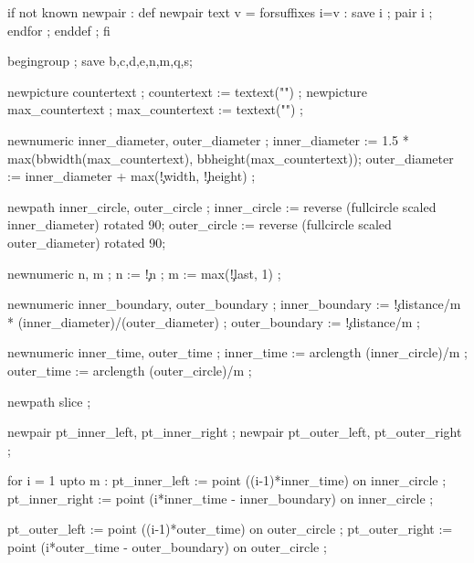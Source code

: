

\startMPdefinitions
  if not known newpair :
      def newpair    text v = forsuffixes i=v : save i ; pair    i ; endfor ; enddef ;
  fi 
\stopMPdefinitions

  begingroup ;
  save b,c,d,e,n,m,q,s;

  newpicture countertext     ; countertext     := textext("\getvisualcountertext")    ;
  newpicture max_countertext ; max_countertext := textext("\getmaxvisualcountertext") ;

  newnumeric inner_diameter, outer_diameter ;
  inner_diameter := 1.5 * max(bbwidth(max_countertext), bbheight(max_countertext));
  outer_diameter := inner_diameter + 
          max(\visualcounterparameter\c!width, \visualcounterparameter\c!height) ;

  newpath inner_circle, outer_circle ;
  inner_circle := reverse (fullcircle scaled inner_diameter) rotated 90;
  outer_circle := reverse (fullcircle scaled outer_diameter) rotated 90;

  newnumeric n, m ;
  n := \visualcounterparameter\c!n ;
  m := max(\visualcounterparameter\c!last, 1) ;

  newnumeric inner_boundary, outer_boundary ;
  inner_boundary := \visualcounterparameter\c!distance/m * (inner_diameter)/(outer_diameter) ;
  outer_boundary := \visualcounterparameter\c!distance/m ;

  newnumeric inner_time, outer_time ;
  inner_time := arclength (inner_circle)/m ;
  outer_time := arclength (outer_circle)/m ;

  newpath slice ;

  newpair pt_inner_left, pt_inner_right ;
  newpair pt_outer_left, pt_outer_right ;

  for i = 1 upto m : 
    pt_inner_left  := point ((i-1)*inner_time)               on inner_circle ;
    pt_inner_right := point (i*inner_time - inner_boundary)  on inner_circle ;

    pt_outer_left  := point ((i-1)*outer_time)               on outer_circle ;
    pt_outer_right := point (i*outer_time - outer_boundary)  on outer_circle ;

